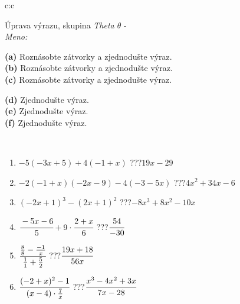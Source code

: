 \documentclass[10pt]{report}
\begin{document}
\newpage
\thispagestyle{empty}
\begin{tabular}{c:c}
\begin{minipage}[c][104.5mm][t]{0.5\linewidth}
\begin{center}
\vspace{7mm}
{\huge Úprava výrazu, skupina \textit{Theta $\theta$} -}\\[5mm]
\textit{Meno:}\phantom{xxxxxxxxxxxxxxxxxxxxxxxxxxxxxxxxxxxxxxxxxxxxxxxxxxxxxxxxxxxxxxxxx}\\[5mm]
\begin{minipage}{0.95\linewidth}
\begin{center}
{\small \begin{minipage}{0.6\textwidth}
\textbf{(a)} Roznásobte zátvorky a zjednodušte výraz. \\[1mm]
\textbf{(b)} Roznásobte zátvorky a zjednodušte výraz. \\[1mm]
\textbf{(c)} Roznásobte zátvorky a zjednodušte výraz.
\end{minipage} \begin{minipage}{0.39\textwidth}
\textbf{(d)} Zjednodušte výraz. \\[1mm]
\textbf{(e)} Zjednodušte výraz. \\[1mm]
\textbf{(f)} Zjednodušte výraz.
\end{minipage}
}
\end{center}
\end{minipage}
\\[4mm]
\begin{minipage}{0.79\linewidth}
\begin{center}
\begin{varwidth}{\linewidth}
\begin{enumerate}
\normalsize
\item $-5(-3x+5)+4(-1+x)$\quad \dotfill\; ???\;\dotfill \quad $19x-29$
\item $-2(-1+x)(-2x-9)-4(-3-5x)$\quad \dotfill\; ???\;\dotfill \quad $4x^2+34x-6$
\item $(-2x+1)^3-(2x+1)^2$\quad \dotfill\; ???\;\dotfill \quad $-8x^3+8x^2-10x$
\item $\cfrac{-5x-6}{5}+9\cdot\cfrac{2+x}{6}$\quad \dotfill\; ???\;\dotfill \quad $\cfrac{54}{-30}$
\item $\cfrac{\frac{8}{8}-\frac{-1}{x}}{\frac{1}{1}+\frac{5}{2}}$\quad \dotfill\; ???\;\dotfill \quad $\cfrac{19x+18}{56x}$
\item $\cfrac{(-2+x)^2-1}{(x-4)\cdot\frac{7}{x}}$\quad \dotfill\; ???\;\dotfill \quad $\cfrac{x^3-4x^2+3x}{7x-28}$

\end{enumerate}
\end{varwidth}
\end{center}
\end{minipage}
\end{center}
\end{minipage}
\end{tabular}
\end{document}
